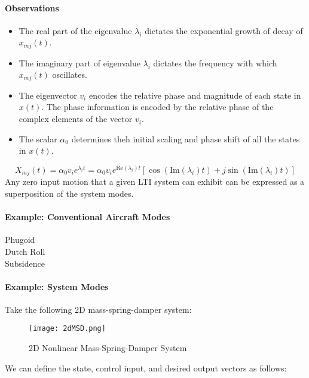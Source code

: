 \documentclass[../notes.tex]{subfiles}
\begin{document}
\paragraph{Observations}
\begin{itemize}
    \item The real part of the eigenvalue $\lambda_i$ dictates the exponential growth of decay of $x_{mj}(t)$.
    \item The imaginary part of eigenvalue $\lambda_i$ dictates the frequency with which $x_{mj}(t)$ oscillates.
    \item The eigenvector $v_i$ encodes the relative phase and magnitude of each state in $x(t)$. The phase information is encoded by the relative phase of the complex elements of the vector $v_i$.
    \item The scalar $\alpha_0$ determines theh initial scaling and phase shift of all the states in $x(t)$.
\end{itemize}
\begin{equation*}
    X_{mj}(t) = \alpha_0 v_i e^{\lambda_i t} = \alpha_0 v_i e^{\text{Re}(\lambda_i)t}[\cos(\text{Im}(\lambda_i)t) + j\sin(\text{Im}(\lambda_i)t)]
\end{equation*}
Any zero input motion that a given LTI system can exhibit can be expressed as a superposition of the system modes.

\paragraph{Example: Conventional Aircraft Modes}
\begin{description}
    \item[Phugoid]
    \item[Dutch Roll]
    \item[Subsidence]   
\end{description}

\paragraph{Example: System Modes}
Take the following 2D mass-spring-damper system:
\begin{figure}[H]
    \centering
    \texttt{[image: 2dMSD.png]}
    \caption{2D Nonlinear Mass-Spring-Damper System}
    \label{fig:2dMSD}
\end{figure}
We can define the state, control input, and desired output vectors as follows:
\end{document}
